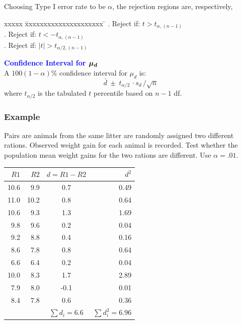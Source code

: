 \documentclass[xcolor=dvipsnames,12pt]{beamer}
\begin{document}
\begin{frame}
 Choosing Type I error rate to be $\alpha$, the rejection regions are, respectively,\\\begin{tabbing}
xxxxx \= xxxxxxxxxxxxxxxxxxxxx \=  \kill
{}. Reject if: $t > t_{\alpha,(n-1)}$\\
. Reject if: $t < -t_{\alpha,(n-1)}$\\
. Reject if: $|t| > t_{\alpha/2,(n-1)}$
\end{tabbing}
 \textbf{\textcolor{blue}{Confidence Interval for $\mbox{\boldmath$\mu_d$}$}}\\[.1in]
 A $100(1-\alpha)\%$ confidence interval for  $\mu_d $ is:
$$
  \bar{d}\ \pm\ t_{\alpha/2}\, \cdot s_d \, /\sqrt{n}
$$
where $t_{\alpha/2}$ is the tabulated $t$ percentile based on $n-1$ df.
\end{frame}




\begin{frame}
\frametitle{Example}
Pairs are animals from the same litter are randomly assigned
two different rations. Observed weight gain for each animal is recorded. Test whether the population mean weight gains for the two rations are different. Use $\alpha=.01$.\\[-.5in]
\begin{center}
\begin{footnotesize}
\begin{tabular}{rrcr} \hline
$R1$ & $R2$ & \multicolumn{1}{c}{$d=R1-R2$}& $d^2$\\ \hline
10.6 &  9.9 & 0.7 & 0.49\\
11.0 & 10.2 & 0.8 & 0.64\\
10.6 &  9.3 & 1.3  & 1.69\\
 9.8 &  9.6 & 0.2  & 0.04\\
 9.2 &  8.8 & 0.4  & 0.16\\
 8.6 &  7.8 & 0.8  & 0.64\\
 6.6 &  6.4 & 0.2  & 0.04\\
10.0 &  8.3 & 1.7  & 2.89\\
 7.9 &  8.0 & -0.1 & 0.01 \\
 8.4 &  7.8 & 0.6  & 0.36  \\ \hline 
     &      & $\sum{d_i}=6.6$ & $\sum{d_i^2}=6.96$ 
\end{tabular}
\end{footnotesize}
\end{center}
\end{frame}
\end{document}
